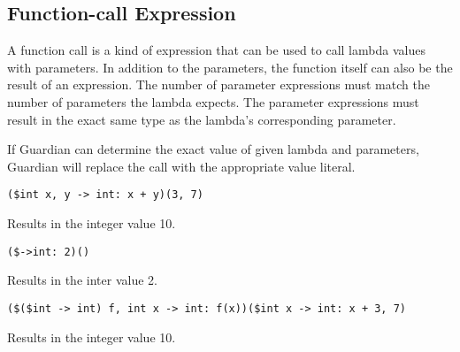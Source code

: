 
\subsection{Function-call Expression}
{
	A function call is a kind of expression that can be used to call
	lambda values with parameters. In addition to the parameters,
	the function itself can also be the result of an expression.
	The number of parameter expressions must match the number of parameters
	the lambda expects. The parameter expressions must result in the
	exact same type as the lambda's corresponding parameter.
	
	If Guardian can determine the exact value of given lambda and parameters,
	Guardian
	will replace the call with the appropriate value literal.
	
	\begin{itemize}
	{
		\item[] \lstinline[language=MAIA, columns=fixed]@($int x, y -> int: x + y)(3, 7)@
		
			Results in the integer value 10.
		
		\item[] \lstinline[language=MAIA, columns=fixed]@($->int: 2)()@
		
			Results in the inter value 2.
		
		\item[] \lstinline[language=MAIA, columns=fixed]@($($int -> int) f, int x -> int: f(x))($int x -> int: x + 3, 7)@
		
			Results in the integer value 10.
	}
	\end{itemize}
}
